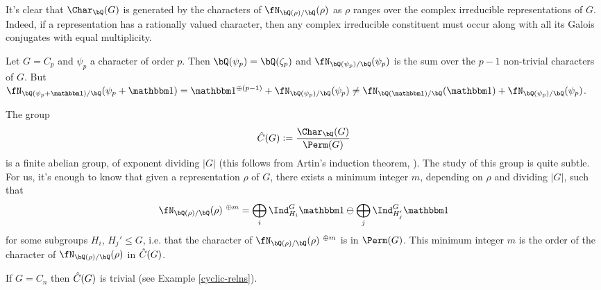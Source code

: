 It's clear that $\Char_{\bQ}(G)$ is generated by the characters of $\repnorm{\rho}$ as $\rho$ ranges over the complex irreducible representations of $G$. Indeed, if a representation has a rationally valued character, then any complex irreducible constituent must occur along with all its Galois conjugates with equal multiplicity.

\begin{example}
    Let $G = C_p$ and $\psi_p$ a character of order $p$. Then $\bQ(\psi_p) = \bQ(\zeta_p)$ and $\repnorm{\psi_p}$ is the sum over the $p - 1$ non-trivial characters of $G$. But $\repnorm{\psi_p + \trivial} = \trivial^{\oplus (p - 1)} + \repnorm{\psi_p} \not= \repnorm{\trivial} + \repnorm{\psi_p}$.
\end{example}



\begin{rem}\label{image-of-burnside}
The group $$\C(G) \defeq \frac{\Char_{\bQ}(G)}{\Perm(G)}$$ is a finite abelian group, of exponent dividing $|G|$ (this follows from Artin's induction theorem, \cite[Theorem 17]{Serre}). The study of this group is quite subtle. For us, it's enough to know that given a representation $\rho$ of $G$, there exists a minimum integer $m$, depending on $\rho$ and dividing $|G|$, such that 
\[ \repnorm{\rho}^{\ \oplus m } = \bigoplus_i \Ind_{H_i}^G \trivial \ominus \bigoplus_j \Ind_{H_j'}^{G} \trivial \]
for some subgroups $H_i$, $H_j' \leq G$, i.e. that the character of $\repnorm{\rho}^{\ \oplus m }$ is in $\Perm(G)$. This minimum integer $m$ is the order of the character of $\repnorm{\rho}$ in $\hat{C}(G)$. 
\end{rem}
\begin{example}
If $G = C_n$ then $\hat{C}(G)$ is trivial (see Example \ref{cyclic-relns}). %
\end{example}

